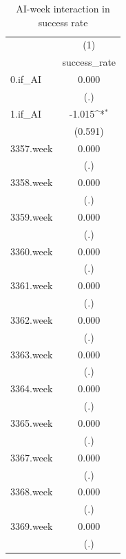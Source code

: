 \begin{table}[htbp]\centering
\def\sym#1{\ifmmode^{#1}\else\(^{#1}\)\fi}
\caption{AI-week interaction in success rate}
\begin{tabular}{l*{1}{c}}
\hline\hline
            &\multicolumn{1}{c}{(1)}\\
            &\multicolumn{1}{c}{success\_rate}\\
\hline
0.if\_AI     &       0.000         \\
            &         (.)         \\
[1em]
1.if\_AI     &      -1.015\sym{*}  \\
            &     (0.591)         \\
[1em]
3357.week   &       0.000         \\
            &         (.)         \\
[1em]
3358.week   &       0.000         \\
            &         (.)         \\
[1em]
3359.week   &       0.000         \\
            &         (.)         \\
[1em]
3360.week   &       0.000         \\
            &         (.)         \\
[1em]
3361.week   &       0.000         \\
            &         (.)         \\
[1em]
3362.week   &       0.000         \\
            &         (.)         \\
[1em]
3363.week   &       0.000         \\
            &         (.)         \\
[1em]
3364.week   &       0.000         \\
            &         (.)         \\
[1em]
3365.week   &       0.000         \\
            &         (.)         \\
[1em]
3367.week   &       0.000         \\
            &         (.)         \\
[1em]
3368.week   &       0.000         \\
            &         (.)         \\
[1em]
3369.week   &       0.000         \\
            &         (.)         \\

\end{tabular}
\end{table}
